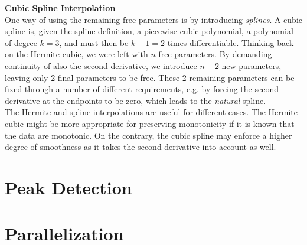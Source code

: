 \documentclass[../../CompleteThesis/Complete_1stDraft.tex]{subfiles}
\begin{document}
\indent \textbf{Cubic Spline Interpolation}\\
One way of using the remaining free parameters is by introducing \textit{splines}. A cubic spline is, given the spline definition, a piecewise cubic polynomial, a polynomial of degree $k=3$, and must then be $k-1 = 2$ times differentiable. Thinking back on the Hermite cubic, we were left with $n$ free parameters. By demanding continuity of also the second derivative, we introduce $n-2$ new parameters, leaving only 2 final parameters to be free. These 2 remaining parameters can be fixed through a number of different requirements, e.g. by forcing the second derivative at the endpoints to be zero, which leads to the \textit{natural} spline.\\
The Hermite and spline interpolations are useful for different cases. The Hermite cubic might be more appropriate for preserving monotonicity if it is known that the data are monotonic. On the contrary, the cubic spline may enforce a higher degree of smoothness as it takes the second derivative into account as well.\\


\section[Peak Detection]{Peak Detection}
\label{Sec:CompMeths_PeakDetection}
\section[Parallelization]{Parallelization}	
\label{Sec:CompMeths_Parallelization}
\end{document}
